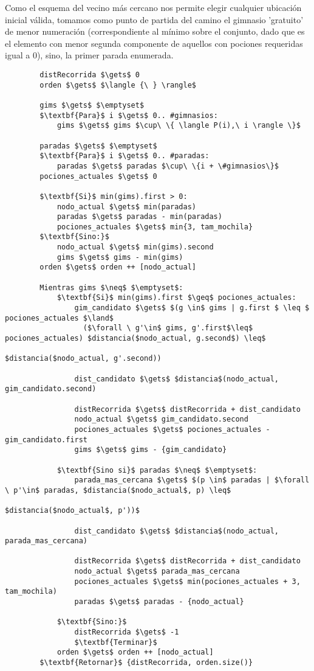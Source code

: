     Como el esquema del vecino más cercano nos permite elegir cualquier ubicación inicial válida, tomamos como punto de partida del camino el gimnasio 'gratuito' de menor numeración (correspondiente al mínimo sobre el conjunto, dado que es el elemento con menor segunda componente de aquellos con pociones requeridas igual a 0), sino, la primer parada enumerada.
        \begin{lstlisting}
        distRecorrida $\gets$ 0
        orden $\gets$ $\langle {\ } \rangle$

        gims $\gets$ $\emptyset$
        $\textbf{Para}$ i $\gets$ 0.. #gimnasios:
            gims $\gets$ gims $\cup\ \{ \langle P(i),\ i \rangle \}$

        paradas $\gets$ $\emptyset$
        $\textbf{Para}$ i $\gets$ 0.. #paradas:
            paradas $\gets$ paradas $\cup\ \{i + \#gimnasios\}$
        pociones_actuales $\gets$ 0

        $\textbf{Si}$ min(gims).first > 0:
            nodo_actual $\gets$ min(paradas)
            paradas $\gets$ paradas - min(paradas)
            pociones_actuales $\gets$ min{3, tam_mochila}
        $\textbf{Sino:}$
            nodo_actual $\gets$ min(gims).second
            gims $\gets$ gims - min(gims)
        orden $\gets$ orden ++ [nodo_actual]

        Mientras gims $\neq$ $\emptyset$:
            $\textbf{Si}$ min(gims).first $\geq$ pociones_actuales:
                gim_candidato $\gets$ $(g \in$ gims | g.first $ \leq $ pociones_actuales $\land$
                  ($\forall \ g'\in$ gims, g'.first$\leq$ pociones_actuales) $distancia($nodo_actual, g.second$) \leq$
                                                            $distancia($nodo_actual, g'.second))

                dist_candidato $\gets$ $distancia$(nodo_actual, gim_candidato.second)

                distRecorrida $\gets$ distRecorrida + dist_candidato
                nodo_actual $\gets$ gim_candidato.second
                pociones_actuales $\gets$ pociones_actuales - gim_candidato.first
                gims $\gets$ gims - {gim_candidato}

            $\textbf{Sino si}$ paradas $\neq$ $\emptyset$:
                parada_mas_cercana $\gets$ $(p \in$ paradas | $\forall \ p'\in$ paradas, $distancia($nodo_actual$, p) \leq$
                                                                 $distancia($nodo_actual$, p'))$

                dist_candidato $\gets$ $distancia$(nodo_actual, parada_mas_cercana)

                distRecorrida $\gets$ distRecorrida + dist_candidato
                nodo_actual $\gets$ parada_mas_cercana
                pociones_actuales $\gets$ min(pociones_actuales + 3, tam_mochila)
                paradas $\gets$ paradas - {nodo_actual}

            $\textbf{Sino:}$
                distRecorrida $\gets$ -1
                $\textbf{Terminar}$
            orden $\gets$ orden ++ [nodo_actual]
        $\textbf{Retornar}$ {distRecorrida, orden.size()}
        \end{lstlisting}

